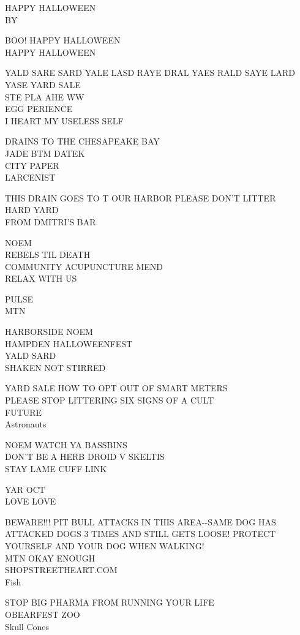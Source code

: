 \documentclass[10pt,letterpaper]{article}
\begin{document}
HAPPY HALLOWEEN\\
BY

BOO! HAPPY HALLOWEEN\\
HAPPY HALLOWEEN

YALD SARE SARD YALE LASD RAYE DRAL YAES RALD SAYE LARD YASE YARD SALE\\
STE PLA AHE WW\\
EGG PERIENCE\\
I HEART MY USELESS SELF

DRAINS TO THE CHESAPEAKE BAY\\
JADE BTM DATEK\\
CITY PAPER\\
LARCENIST

THIS DRAIN GOES TO T OUR HARBOR PLEASE DON'T LITTER\\
HARD YARD\\
FROM DMITRI'S BAR

NOEM\\
REBELS TIL DEATH\\
COMMUNITY ACUPUNCTURE MEND\\
RELAX WITH US

PULSE\\
MTN

HARBORSIDE NOEM\\
HAMPDEN HALLOWEENFEST\\
YALD SARD\\
SHAKEN NOT STIRRED

YARD SALE HOW TO OPT OUT OF SMART METERS\\
PLEASE STOP LITTERING SIX SIGNS OF A CULT\\
FUTURE\\
Astronauts

NOEM WATCH YA BASSBINS\\
DON'T BE A HERB DROID V SKELTIS\\
STAY LAME CUFF LINK

YAR OCT\\
LOVE LOVE

BEWARE!!! PIT BULL ATTACKS IN THIS AREA{-}{-}SAME DOG HAS ATTACKED DOGS 3 TIMES AND STILL GETS LOOSE! PROTECT YOURSELF AND YOUR DOG WHEN WALKING!\\
MTN OKAY ENOUGH\\
SHOPSTREETHEART.COM\\
Fish

STOP BIG PHARMA FROM RUNNING YOUR LIFE\\
OBEARFEST ZOO\\
Skull Cones
\end{document}
